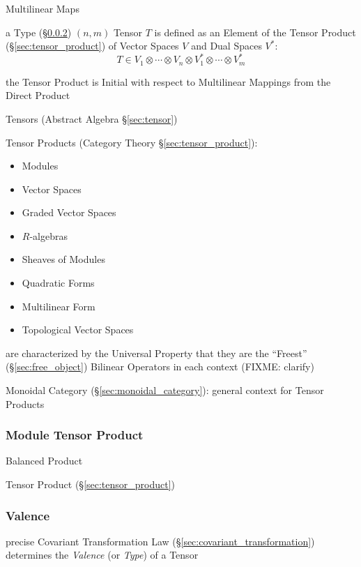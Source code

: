 \asterism


Multilinear Maps


\asterism


a Type (\S\ref{sec:valence}) $(n,m)$ Tensor $T$ is defined as an
Element of the Tensor Product (\S\ref{sec:tensor_product}) of Vector
Spaces $V$ and Dual Spaces $V^*$:
\[
  T \in V_1 \otimes \cdots \otimes V_n
    \otimes V^*_1 \otimes \cdots \otimes V^*_m
\]

the Tensor Product is Initial with respect to Multilinear Mappings
from the Direct Product

Tensors (Abstract Algebra \S\ref{sec:tensor})

Tensor Products (Category Theory \S\ref{sec:tensor_product}):
\begin{itemize}
  \item Modules
  \item Vector Spaces
  \item Graded Vector Spaces
  \item $R$-algebras
  \item Sheaves of Modules
  \item Quadratic Forms
  \item Multilinear Form
  \item Topological Vector Spaces
\end{itemize}
are characterized by the Universal Property that they are the ``Freest''
(\S\ref{sec:free_object}) Bilinear Operators in each context
(FIXME: clarify)

Monoidal Category (\S\ref{sec:monoidal_category}): general context for
Tensor Products



\subsubsection{Module Tensor Product}\label{sec:module_tensor_product}

Balanced Product

\fist Tensor Product (\S\ref{sec:tensor_product})



\subsubsection{Valence}\label{sec:valence}

precise Covariant Transformation Law
(\S\ref{sec:covariant_transformation}) determines the \emph{Valence}
(or \emph{Type}) of a Tensor

